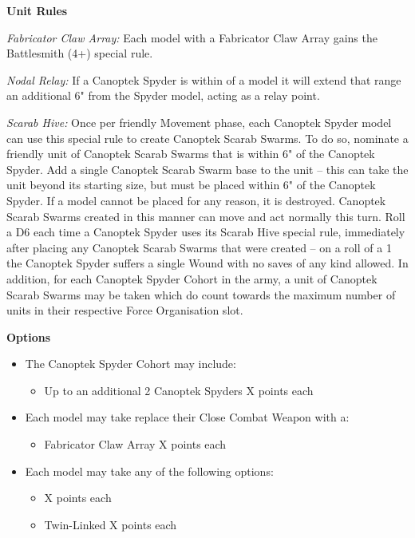 \begin{minipage}[t]{0.72\textwidth}
	\vspace*{2em}
	\textbf{Unit Rules}
	
	\textit{Fabricator Claw Array:} Each model with a Fabricator Claw Array gains the Battlesmith (4+) special rule.
	
	\textit{Nodal Relay:} If a Canoptek Spyder is within  of a model it will extend that range an additional 6" from the Spyder model, acting as a relay point.
	
	\textit{Scarab Hive:} Once per friendly Movement phase, each Canoptek Spyder model can use this special rule to create Canoptek Scarab Swarms. To do so, nominate a friendly unit of Canoptek Scarab Swarms that is within 6" of the Canoptek Spyder. Add a single Canoptek Scarab Swarm base to the unit – this can take the unit beyond its starting size, but must be placed within 6" of the Canoptek Spyder. If a model cannot be placed for any reason, it is destroyed. Canoptek Scarab Swarms created in this manner can move and act normally this turn. Roll a D6 each time a Canoptek Spyder uses its Scarab Hive special rule, immediately after placing any Canoptek Scarab Swarms that were created – on a roll of a 1 the Canoptek Spyder suffers a single Wound with no saves of any kind allowed. In addition, for each Canoptek Spyder Cohort in the army, a unit of Canoptek Scarab Swarms may be taken which do count towards the maximum number of units in their respective Force Organisation slot.
	
	
	\vspace*{2em}
	\textbf{Options}
	\begin{itemize}
		\item The Canoptek Spyder Cohort may include:
		\begin{itemize}
			\item Up to an additional 2 Canoptek Spyders \dotfill X points each
		\end{itemize}
		\item Each model may take replace their Close Combat Weapon with a:
		\begin{itemize}
			\item Fabricator Claw Array \dotfill X points each
		\end{itemize}
		\item Each model may take any of the following options:
		\begin{itemize}
		\item {} \dotfill X points each
		\item Twin-Linked  \dotfill X points each
		\end{itemize}
	\end{itemize}
\end{minipage}


